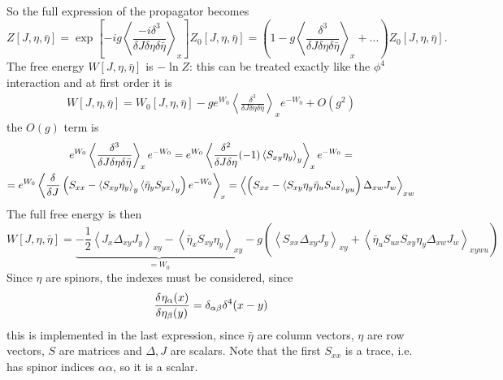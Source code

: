 So the full expression of the propagator becomes
\[
    Z[J,\eta,\bar\eta] = \exp\left[ -ig\left\langle \frac{-i\delta^3}{\delta J
    \delta\eta\delta\bar\eta}\right\rangle_x\right]Z_0[J,\eta,\bar\eta]=
    \left(1-g \left\langle \frac{\delta^3}{\delta J\delta\eta\delta\bar\eta}
    \right\rangle_x+... \right)Z_0[J,\eta,\bar\eta].
\]
The free energy $W[J,\eta,\bar\eta]$ is $-\ln Z$: this can be treated
exactly like the $\phi^4$ interaction and at first order it is
\begin{gather*}
    W[J,\eta,\bar\eta] = W_0[J,\eta,\bar\eta] - g e^{W_0}\left\langle 
    \frac{\delta^3}{\delta J\delta\eta\delta\bar\eta}\right\rangle_xe^{-W_0}
    +O(g^2)
\end{gather*}
the $O(g)$ term is
\begin{gather*}
    e^{W_0}\left\langle \frac{\delta^3}{\delta J\delta\eta\delta\bar\eta}
    \right\rangle_xe^{-W_0}=e^{W_0}\left\langle \frac{\delta^2}{\delta J\delta\eta
    }(-1)\left\langle S_{xy}\eta_y\right\rangle_y\right\rangle_xe^{-W_0}=\\=
    e^{W_0}\left\langle \fdv[]{}{J}\left(S_{xx}-\left\langle S_{xy}\eta_y
    \right\rangle_y \left\langle \bar\eta_yS_{yx}\right\rangle_y\right)
    e^{-W_0}\right\rangle_x=
    \left\langle \left(S_{xx}-\left\langle S_{xy}\eta_y\bar\eta_uS_{ux}
    \right\rangle_{yu} \right) \Delta_{xw}J_w \right\rangle_{xw}
\end{gather*}
The full free energy is then
\[
    W[J,\eta,\bar\eta] = \underbrace{-\frac{1}{2}\left\langle J_x\Delta_{xy}J_y
    \right\rangle_{xy} - \left\langle \bar\eta_xS_{xy}\eta_y\right\rangle_{xy}}_
    {=W_0}-g
    \left(
    \left\langle S_{xx}\Delta_{xy}J_y\right\rangle_{xy} +
    \left\langle\bar\eta_uS_{ux}S_{xy}\eta_y\Delta_{xw}J_w\right\rangle_{xywu}
    \right) 
\]
Since $\eta$ are spinors, the indexes must be considered, since
\[
    \fdv[]{\eta_\alpha(x)}{\eta_\beta(y)}=\delta_{\alpha\beta}\delta^4(x-y)
\]
this is implemented in the last expression, since $\bar\eta$ are column vectors,
$\eta$ are row vectors, $S$ are matrices and $\Delta,J$ are scalars.
Note that the first $S_{xx}$ is a trace, i.e. has spinor indices $\alpha\alpha$,
so it is a scalar.
